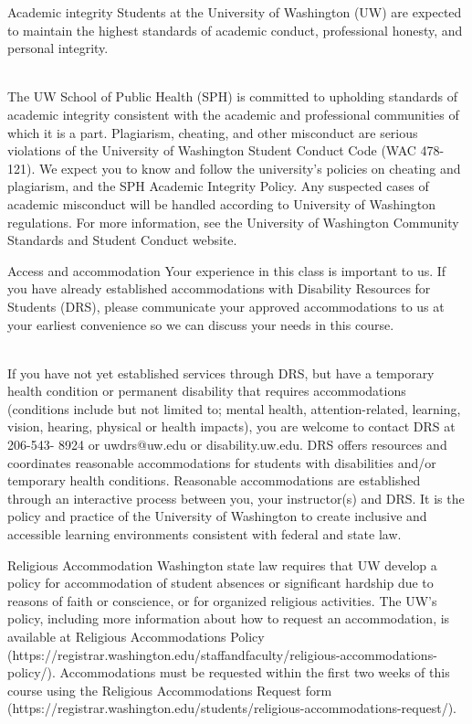 \documentclass[10pt,t]{beamer}
\begin{document}
\begin{frame}{Academic integrity}
Students at the University of Washington (UW) are expected to maintain the highest standards of academic conduct, professional honesty, and personal integrity.
 \\~\

The UW School of Public Health (SPH) is committed to upholding standards of academic integrity consistent with the academic and professional communities of which it is a part. Plagiarism, cheating, and other misconduct are serious violations of the University of Washington Student Conduct Code (WAC 478-121). We expect you to know and follow the university’s policies on cheating and plagiarism, and the SPH Academic Integrity Policy. Any suspected cases of academic misconduct will be handled according to University of Washington regulations. For more information, see the University of Washington Community Standards and Student Conduct website.

\end{frame}

\begin{frame}{Access and accommodation}
\small Your experience in this class is important to us. If you have already established accommodations with Disability Resources for Students (DRS), please communicate your approved accommodations to us at your earliest convenience so we can discuss your needs in this course.
\\~\

\small If you have not yet established services through DRS, but have a temporary health condition or permanent disability that requires accommodations (conditions include but not limited to; mental health, attention-related, learning, vision, hearing, physical or health impacts), you are welcome to contact DRS at 206-543- 8924 or uwdrs@uw.edu or disability.uw.edu. DRS offers resources and coordinates reasonable accommodations for students with disabilities and/or temporary health conditions. Reasonable accommodations are established through an interactive process between you, your instructor(s) and DRS. It is the policy and practice of the University of Washington to create inclusive and accessible learning environments consistent with federal and state law.

\end{frame}

\begin{frame}{Religious Accommodation}
Washington state law requires that UW develop a policy for accommodation of student absences or significant hardship due to reasons of faith or conscience, or for organized religious activities. The UW’s policy, including more information about how to request an accommodation, is available at Religious Accommodations Policy (https://registrar.washington.edu/staffandfaculty/religious-accommodations-policy/). Accommodations must be requested within the first two weeks of this course using the Religious Accommodations Request form (https://registrar.washington.edu/students/religious-accommodations-request/).
\end{frame}
\end{document}
